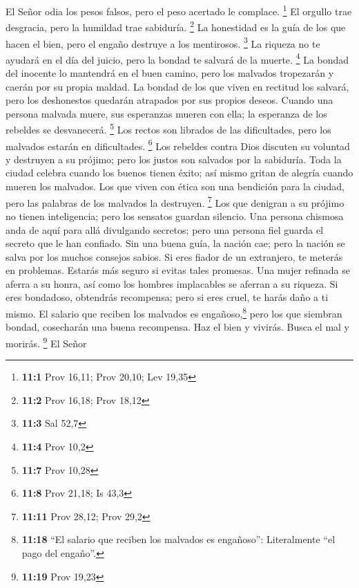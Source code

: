  El Señor odia los pesos falsos, pero el peso acertado le
complace. \footnote{\textbf{11:1} Prov 16,11; Prov 20,10; Lev 19,35}
 El orgullo trae desgracia, pero la humildad trae
sabiduría. \footnote{\textbf{11:2} Prov 16,18; Prov 18,12}
 La honestidad es la guía de los que hacen el bien, pero
el engaño destruye a los mentirosos. \footnote{\textbf{11:3} Sal 52,7}
 La riqueza no te ayudará en el día del juicio, pero la
bondad te salvará de la muerte. \footnote{\textbf{11:4} Prov 10,2}
 La bondad del inocente lo mantendrá en el buen camino,
pero los malvados tropezarán y caerán por su propia maldad.
 La bondad de los que viven en rectitud los salvará, pero
los deshonestos quedarán atrapados por sus propios deseos.
 Cuando una persona malvada muere, sus esperanzas mueren
con ella; la esperanza de los rebeldes se desvanecerá. \footnote{\textbf{11:7}
  Prov 10,28}  Los rectos son librados de las
dificultades, pero los malvados estarán en dificultades. \footnote{\textbf{11:8}
  Prov 21,18; Is 43,3}  Los rebeldes contra Dios discuten
su voluntad y destruyen a su prójimo; pero los justos son salvados por
la sabiduría.  Toda la ciudad celebra cuando los buenos
tienen éxito; así mismo gritan de alegría cuando mueren los malvados.
 Los que viven con ética son una bendición para la
ciudad, pero las palabras de los malvados la destruyen. \footnote{\textbf{11:11}
  Prov 28,12; Prov 29,2}  Los que denigran a su prójimo
no tienen inteligencia; pero los sensatos guardan silencio.
 Una persona chismosa anda de aquí para allá divulgando
secretos; pero una persona fiel guarda el secreto que le han confiado.
 Sin una buena guía, la nación cae; pero la nación se
salva por los muchos consejos sabios.  Si eres fiador de
un extranjero, te meterás en problemas. Estarás más seguro si evitas
tales promesas.  Una mujer refinada se aferra a su honra,
así como los hombres implacables se aferran a su riqueza.
 Si eres bondadoso, obtendrás recompensa; pero si eres
cruel, te harás daño a ti mismo.  El salario que reciben
los malvados es engañoso,\footnote{\textbf{11:18} ``El salario que
  reciben los malvados es engañoso'': Literalmente ``el pago del
  engaño''.} pero los que siembran bondad, cosecharán una buena
recompensa.  Haz el bien y vivirás. Busca el mal y
morirás. \footnote{\textbf{11:19} Prov 19,23}  El Señor
